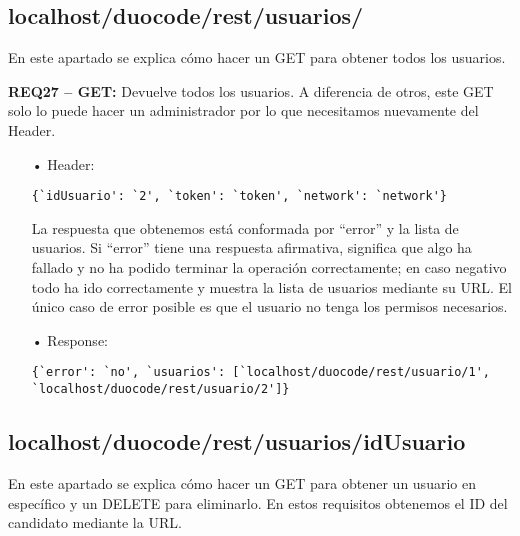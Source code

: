 \subsection{localhost/duocode/rest/usuarios/}
En este apartado se explica cómo hacer un GET para obtener todos los usuarios.

\textbf{REQ27 – GET:} Devuelve todos los usuarios. A diferencia de otros, este GET solo lo puede hacer un administrador por lo que necesitamos nuevamente del Header.
\begin{itemize}
\item[•]
Header:
{\codesize
\begin{verbatim}
{`idUsuario': `2', `token': `token', `network': `network'}
\end{verbatim}
}

La respuesta que obtenemos está conformada por ``error'' y la lista de usuarios. Si ``error'' tiene una respuesta afirmativa, significa que algo ha fallado y no ha podido terminar la operación correctamente; en caso negativo todo ha ido correctamente y muestra la lista de usuarios mediante su URL. El único caso de error posible es que el usuario no tenga los permisos necesarios.
\item[•]
Response: 
{\codesize
\begin{verbatim}
{`error': `no', `usuarios': [`localhost/duocode/rest/usuario/1', 
`localhost/duocode/rest/usuario/2']}
\end{verbatim}
}
\end{itemize}

\subsection{localhost/duocode/rest/usuarios/idUsuario}
En este apartado se explica cómo hacer un GET para obtener un usuario en específico y un DELETE para eliminarlo.
En estos requisitos obtenemos el ID del candidato mediante la URL.

